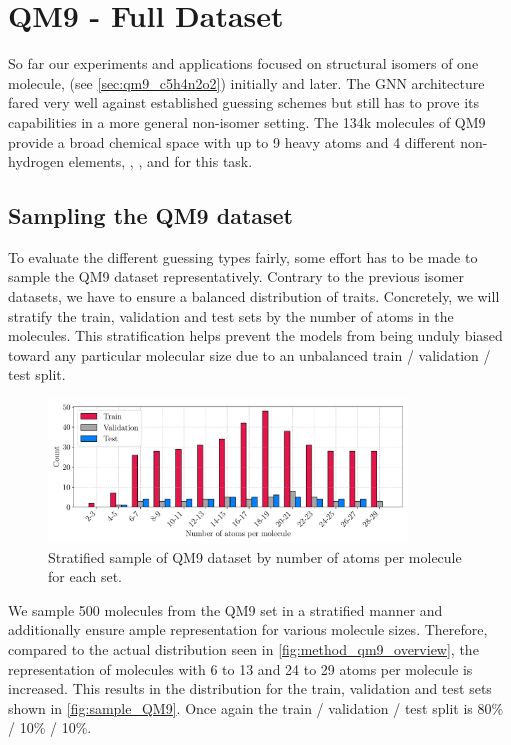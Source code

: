 \section{QM9 - Full Dataset}
\label{sec:qm9_isomers_benchmark}
So far our experiments and applications focused on structural isomers of one molecule,  (see \autoref{sec:qm9_c5h4n2o2}) initially and  later. The GNN architecture fared very well against established guessing schemes but still has to prove its capabilities in a more general non-isomer setting. The 134k molecules of QM9 \parencite{ref:data_qm9} provide a broad chemical space with up to 9 heavy atoms and 4 different non-hydrogen elements, , ,  and  for this task. 
\subsection{Sampling the QM9 dataset}
\label{sec:qm9_full_isomers_sampling}
To evaluate the different guessing types fairly, some effort has to be made to sample the QM9 dataset representatively. Contrary to the previous isomer datasets, we have to ensure a balanced distribution of traits. Concretely, we will stratify the train, validation and test sets by the number of atoms in the molecules. This stratification helps prevent the models from being unduly biased toward any particular molecular size due to an unbalanced train / validation / test split.
\begin{figure}[h]
    \centering
    \includegraphics[width=0.85\textwidth]{../fig/application/strat_sample.pdf}
    \caption[Stratified sample of QM9 dataset]{Stratified sample of QM9 dataset by number of atoms per molecule for each set.}
    \label{fig:sample_QM9}
\end{figure}
We sample 500 molecules from the QM9 set in a stratified manner and additionally ensure ample representation for various molecule sizes. Therefore, compared to the actual distribution seen in \autoref{fig:method_qm9_overview}, the representation of molecules with 6 to 13 and 24 to 29 atoms per molecule is increased. This results in the distribution for the train, validation and test sets shown in \autoref{fig:sample_QM9}. Once again the train / validation / test split is 80\% / 10\% / 10\%.\\

